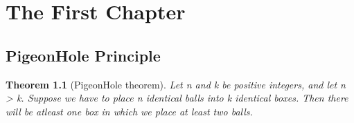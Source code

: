 \chapter{The First Chapter}



\newtheorem{theorem}{Theorem}

	\section{PigeonHole Principle}
	\begin{theorem}[PigeonHole theorem]
		\label{PigeonHole}
		Let n and k be positive integers,
		and let n > k.
		Suppose we have to place n identical balls
		into k identical boxes. Then there will be
		atleast one box in which we place 
		at least two balls.

	\end{theorem}
	
